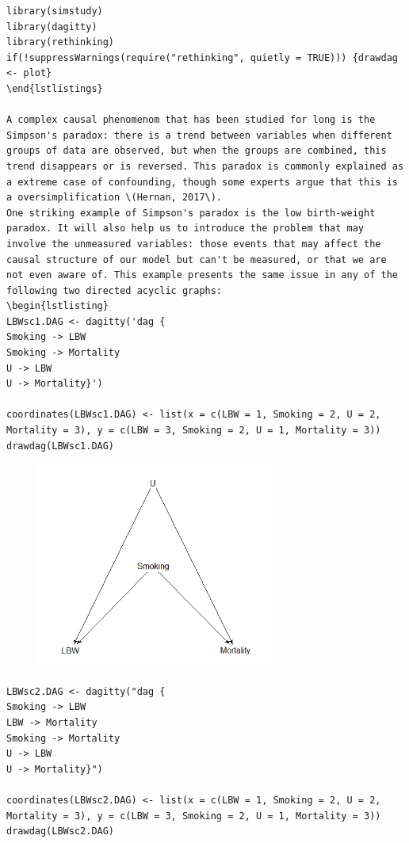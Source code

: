 \documentclass{article}
\begin{document}
\begin{lstlisting}
library(simstudy)
library(dagitty)
library(rethinking)
if(!suppressWarnings(require("rethinking", quietly = TRUE))) {drawdag <- plot}
\end{lstlistings}

A complex causal phenomenom that has been studied for long is the Simpson's paradox: there is a trend between variables when different groups of data are observed, but when the groups are combined, this trend disappears or is reversed. This paradox is commonly explained as a extreme case of confounding, though some experts argue that this is a oversimplification \(Hernan, 2017\).
One striking example of Simpson's paradox is the low birth-weight paradox. It will also help us to introduce the problem that may involve the unmeasured variables: those events that may affect the causal structure of our model but can't be measured, or that we are not even aware of. This example presents the same issue in any of the following two directed acyclic graphs:
\begin{lstlisting}
LBWsc1.DAG <- dagitty('dag {
Smoking -> LBW
Smoking -> Mortality
U -> LBW
U -> Mortality}')

coordinates(LBWsc1.DAG) <- list(x = c(LBW = 1, Smoking = 2, U = 2, Mortality = 3), y = c(LBW = 3, Smoking = 2, U = 1, Mortality = 3))
drawdag(LBWsc1.DAG)
\end{lstlisting}
\begin{figure}[h]
\includegraphics[width=8cm]{LBW1DAG.png}
\centering
\end{figure}
\newpage
\begin{lstlisting}
LBWsc2.DAG <- dagitty("dag {
Smoking -> LBW
LBW -> Mortality
Smoking -> Mortality
U -> LBW
U -> Mortality}")

coordinates(LBWsc2.DAG) <- list(x = c(LBW = 1, Smoking = 2, U = 2, Mortality = 3), y = c(LBW = 3, Smoking = 2, U = 1, Mortality = 3))
drawdag(LBWsc2.DAG)
\end{lstlisting}
\end{document}
